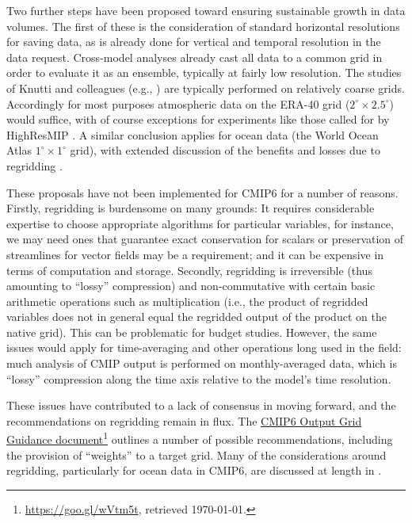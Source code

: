 \documentclass[gmd,manuscript]{copernicus}
\newcommand{\pllabel}[1]{\label{p-#1}\linelabel{l-#1}}
\newcommand{\urlref}[2] {\href{#1}{#2}\footnote{\url{#1}, retrieved \today.}}
\begin{document}
Two further steps have been proposed toward ensuring sustainable
growth in data volumes.
\pllabel{RC2-21}
The first of these is the consideration of standard horizontal
resolutions for saving data, as is already done for vertical and
temporal resolution in the data request. Cross-model analyses already
cast all data to a common grid in order to evaluate it as an ensemble,
typically at fairly low resolution. The studies of Knutti and
colleagues (e.g., \cite{ref:knuttietal2017}) are typically performed
on relatively coarse grids. Accordingly for most purposes
atmospheric data on the ERA-40 grid ($2^\circ\times 2.5^\circ$) would
suffice, with of course exceptions for experiments like those called
for by HighResMIP \citep{ref:haarsmaetal2016}. A similar
conclusion applies for ocean data (the World Ocean Atlas
$1^\circ\times 1^\circ$ grid), with extended discussion of the
benefits and losses due to regridding
\citep[see][]{ref:griffiesetal2014,ref:griffiesetal2016}.
\pllabel{RC3-14}

These proposals have not been implemented for CMIP6 for a number
of reasons. Firstly, regridding is burdensome on many grounds: 
It requires
considerable expertise to choose appropriate algorithms for particular
variables, for instance, we may need ones that guarantee exact
conservation for scalars or preservation of streamlines for vector
fields may be a requirement; and it can be expensive in terms of
computation and storage. 
Secondly, regridding is irreversible (thus
amounting to ``lossy'' compression) and non-commutative with certain
basic arithmetic operations such as multiplication (i.e., the product
of regridded variables does not in general equal the regridded output
of the product on the native grid). This can be problematic for
budget studies. However, the same issues would apply for 
time-averaging and other operations long used in the field: much
analysis of CMIP output is performed on monthly-averaged data, which
is ``lossy'' compression along the time axis relative to the model's
time resolution.

These issues have contributed to a lack of consensus in moving forward,
and the recommendations on regridding remain in flux. The
\urlref{https://goo.gl/wVtm5t}{CMIP6 Output Grid Guidance document}
outlines a number of possible recommendations, including the provision
of ``weights'' to a target grid. Many of the considerations around
regridding, particularly for ocean data in CMIP6, are discussed at
length in \cite{ref:griffiesetal2016}. 
\end{document}
